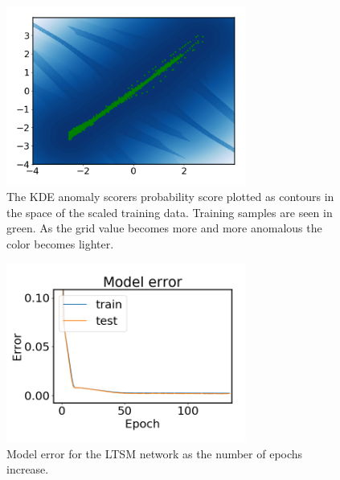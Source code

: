     
     \begin{figure}
        \centering
        \includegraphics[width=0.7\textwidth]{report/figures/analysis/plant1_training/kde_boundary.png}
        \caption{The KDE anomaly scorers probability score plotted as contours in the space of the scaled training data. Training samples are seen in green. As the grid value becomes more and more anomalous the color becomes lighter.}
        \label{fig:my_label}
    \end{figure}
    
    
    \begin{figure}
        \centering
        \includegraphics[width=0.7\textwidth]{report/figures/analysis/plant1_training/lstm_model_error.png}
        \caption{Model error for the LTSM network as the number of epochs increase.}
    \end{figure}
    
    
